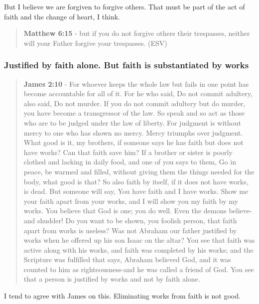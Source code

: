 \documentclass[11pt]{article}
\begin{document}
But I believe we are forgiven to forgive others. That must be part of the act of faith and the change of heart, I think.

\begin{quote}
\textbf{Matthew 6:15} - but if you do not forgive others their trespasses, neither will your Father forgive your trespasses. (ESV)
\end{quote}

\subsubsection{Justified by faith alone. But faith is substantiated by works}
\label{sec:orgd312f99}
\begin{quote}
\textbf{James 2:10} - For whoever keeps the whole law but fails in one point has become accountable for all of it. For he who said, Do not commit adultery, also said, Do not murder. If you do not commit adultery but do murder, you have become a transgressor of the law. So speak and so act as those who are to be judged under the law of liberty. For judgment is without mercy to one who has shown no mercy. Mercy triumphs over judgment. What good is it, my brothers, if someone says he has faith but does not have works? Can that faith save him? If a brother or sister is poorly clothed and lacking in daily food, and one of you says to them, Go in peace, be warmed and filled, without giving them the things needed for the body, what good is that? So also faith by itself, if it does not have works, is dead. But someone will say, You have faith and I have works. Show me your faith apart from your works, and I will show you my faith by my works. You believe that God is one; you do well. Even the demons believe-and shudder! Do you want to be shown, you foolish person, that faith apart from works is useless? Was not Abraham our father justified by works when he offered up his son Isaac on the altar? You see that faith was active along with his works, and faith was completed by his works; and the Scripture was fulfilled that says, Abraham believed God, and it was counted to him as righteousness-and he was called a friend of God. You see that a person is justified by works and not by faith alone.
\end{quote}

I tend to agree with James on this.
Eliminating works from faith is not good.
\end{document}

